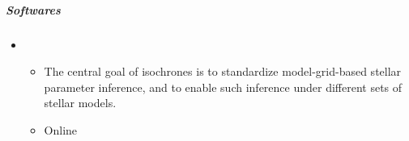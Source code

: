 \documentclass[letterpaper,10pt,english]{sphinxmanual}
\begin{document}
\subparagraph{Softwares}
\label{\detokenize{resource/astro/topics/stellar_and_spops:softwares}}\begin{itemize}
\item {} 
\begin{itemize}
\item {} 
The central goal of isochrones is to standardize model-grid-based
stellar parameter inference, and to enable such inference under
different sets of stellar models.

\item {} 
Online 

\end{itemize}

\end{itemize}
\end{document}
